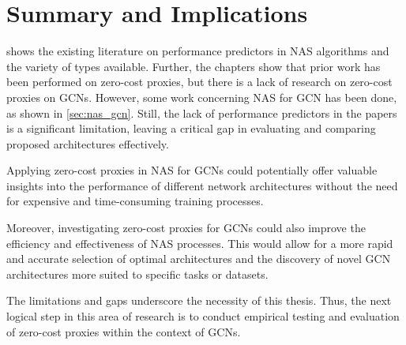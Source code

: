 \section{Summary and Implications}

 shows the existing literature on performance predictors in \gls{NAS} algorithms and the variety of types available. Further, the chapters show that prior work has been performed on zero-cost proxies, but there is a lack of research on zero-cost proxies on \glspl{GCN}. However, some work concerning \gls{NAS} for \gls{GCN} has been done, as shown in \cref{sec:nas_gcn}. Still, the lack of performance predictors in the papers is a significant limitation, leaving a critical gap in evaluating and comparing proposed architectures effectively. 

Applying zero-cost proxies in \gls{NAS} for \glspl{GCN} could potentially offer valuable insights into the performance of different network architectures without the need for expensive and time-consuming training processes.

Moreover, investigating zero-cost proxies for \glspl{GCN} could also improve the efficiency and effectiveness of \gls{NAS} processes. This would allow for a more rapid and accurate selection of optimal architectures and the discovery of novel \gls{GCN} architectures more suited to specific tasks or datasets.

The limitations and gaps underscore the necessity of this thesis. Thus, the next logical step in this area of research is to conduct empirical testing and evaluation of zero-cost proxies within the context of \glspl{GCN}.
